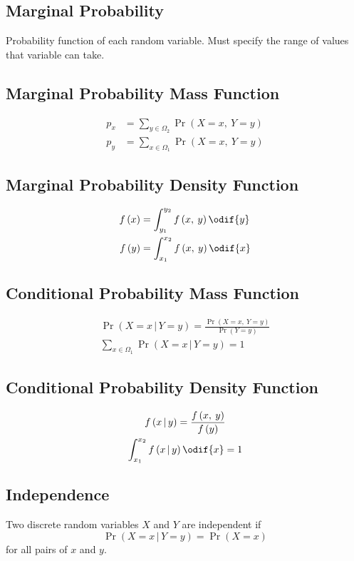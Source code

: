 \documentclass{article}
\begin{document}
\begin{multicols}{3}
    \subsection{Marginal Probability}
    Probability function of each random variable.
    Must specify the range of values that variable can take.
    \subsection{Marginal Probability Mass Function}
    \begin{align*}
        p_x & = \sum_{y \in \Omega_2} \Pr{\left( X = x,\: Y = y \right)} \\
        p_y & = \sum_{x \in \Omega_1} \Pr{\left( X = x,\: Y = y \right)}
    \end{align*}
    \subsection{Marginal Probability Density Function}
    \begin{align*}
        f\left( x \right) & = \int_{y_1}^{y_2} f\left( x,\: y \right) \odif{y} \\
        f\left( y \right) & = \int_{x_1}^{x_2} f\left( x,\: y \right) \odif{x}
    \end{align*}
    \subsection{Conditional Probability Mass Function}
    \begin{gather*}
        \Pr{\left( X = x \,\vert\, Y = y \right)} = \frac{\Pr{\left( X = x,\: Y = y \right)}}{\Pr{\left( Y = y \right)}} \\
        \sum_{x \in \Omega_1} \Pr{\left( X = x \,\vert\, Y = y \right)} = 1
    \end{gather*}
    \subsection{Conditional Probability Density Function}
    \begin{gather*}
        f\left( x \,\vert\, y \right) = \frac{f\left( x,\: y \right)}{f\left( y \right)} \\
        \int_{x_1}^{x_2} f\left( x \,\vert\, y \right) \odif{x} = 1
    \end{gather*}
    \subsection{Independence}
    Two discrete random variables \(X\) and \(Y\) are independent if
    \begin{equation*}
        \Pr{\left( X = x \,\vert\, Y = y \right)} = \Pr{\left( X = x \right)}
    \end{equation*}
    for all pairs of \(x\) and \(y\).


\end{multicols}
\end{document}
